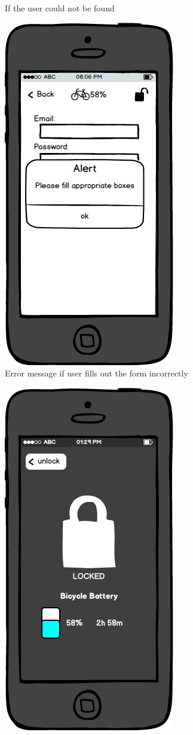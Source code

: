 \documentclass[a4paper]{report}
\begin{document}
{\begin{figure}
\caption{If the user could not be found}
\end{figure}
\clearpage
\begin{figure}
\centering
\includegraphics[scale=0.9]{figures/prototype_2/add_user_boxes_err}
\caption{Error message if user fills out the form incorrectly}
\end{figure}
\clearpage
\begin{figure}
\centering
\includegraphics[scale=0.9]{figures/prototype_2/locked}

\end{figure}}
\end{document}
